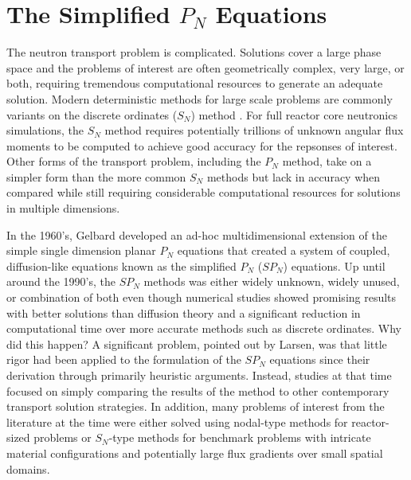\chapter{The Simplified $P_N$ Equations}
\label{ch:spn_equations}

The neutron transport problem is complicated. Solutions cover a large
phase space and the problems of interest are often geometrically
complex, very large, or both, requiring tremendous computational
resources to generate an adequate solution. Modern deterministic
methods for large scale problems are commonly variants on the discrete
ordinates ($S_N$) method \citep{evans_denovo:_2010}. For full reactor
core neutronics simulations, the $S_N$ method requires potentially
trillions of unknown angular flux moments to be computed to achieve
good accuracy for the repsonses of interest. Other forms of the
transport problem, including the $P_N$ method, take on a simpler form
than the more common $S_N$ methods but lack in accuracy when compared
while still requiring considerable computational resources for
solutions in multiple dimensions.

In the 1960's, Gelbard developed an ad-hoc multidimensional extension
of the simple single dimension planar $P_N$ equations that created a
system of coupled, diffusion-like equations known as the simplified
$P_N$ ($SP_N$) equations. Up until around the 1990's, the $SP_N$
methods was either widely unknown, widely unused, or combination of
both even though numerical studies showed promising results with
better solutions than diffusion theory and a significant reduction in
computational time over more accurate methods such as discrete
ordinates. Why did this happen? A significant problem, pointed out by
Larsen, was that little rigor had been applied to the formulation of
the $SP_N$ equations since their derivation through primarily
heuristic arguments. Instead, studies at that time focused on simply
comparing the results of the method to other contemporary transport
solution strategies. In addition, many problems of interest from the
literature at the time were either solved using nodal-type methods for
reactor-sized problems or $S_N$-type methods for benchmark problems
with intricate material configurations and potentially large flux
gradients over small spatial domains.

